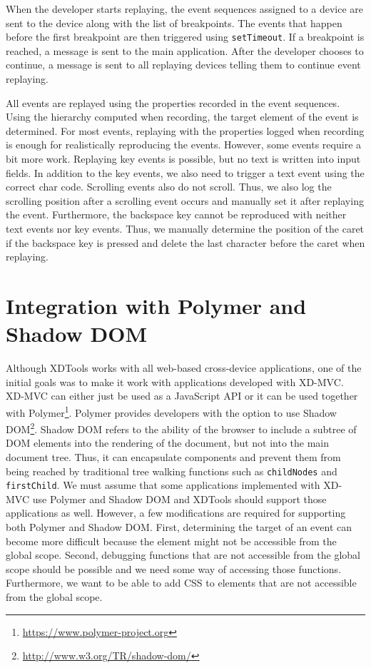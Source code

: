When the developer starts replaying, the event sequences assigned to a device are sent to the device along with the list of breakpoints. The events that happen before the first breakpoint are then triggered using \lstinline|setTimeout|. If a breakpoint is reached, a message is sent to the main application. After the developer chooses to continue, a message is sent to all replaying devices telling them to continue event replaying.

All events are replayed using the properties recorded in the event sequences. Using the hierarchy computed when recording, the target element of the event is determined. For most events, replaying with the properties logged when recording is enough for realistically reproducing the events. However, some events require a bit more work. Replaying key events is possible, but no text is written into input fields. In addition to the key events, we also need to trigger a text event using the correct char code. Scrolling events also do not scroll. Thus, we also log the scrolling position after a scrolling event occurs and manually set it after replaying the event. Furthermore, the backspace key cannot be reproduced with neither text events nor key events. Thus, we manually determine the position of the caret if the backspace key is pressed and delete the last character before the caret when replaying. 

\section{Integration with Polymer and Shadow DOM}

Although XDTools works with all web-based cross-device applications, one of the initial goals was to make it work with applications developed with XD-MVC. XD-MVC can either just be used as a JavaScript API or it can be used together with Polymer\footnote{\url{https://www.polymer-project.org}}. Polymer provides developers with the option to use Shadow DOM\footnote{\url{http://www.w3.org/TR/shadow-dom/}}. Shadow DOM refers to the ability of the browser to include a subtree of DOM elements into the rendering of the document, but not into the main document tree. Thus, it can encapsulate components and prevent them from being reached by traditional tree walking functions such as \lstinline|childNodes| and \lstinline|firstChild|. We must assume that some applications implemented with XD-MVC use Polymer and Shadow DOM and XDTools should support those applications as well. However, a few modifications are required for supporting both Polymer and Shadow DOM. First, determining the target of an event can become more difficult because the element might not be accessible from the global scope. Second, debugging functions that are not accessible from the global scope should be possible and we need some way of accessing those functions. Furthermore, we want to be able to add CSS to elements that are not accessible from the global scope.

